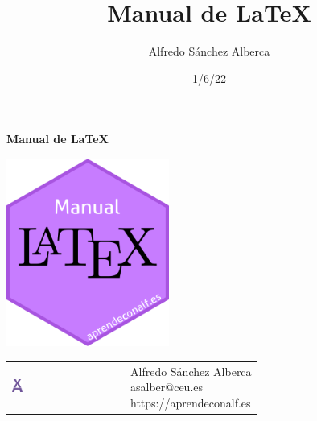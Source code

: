 \documentclass[
  a4paper,
]{scrreport}
\title{Manual de LaTeX}
\author{Alfredo Sánchez Alberca}
\date{1/6/22}
\renewcommand*\contentsname{Tabla de contenidos}
\newcommand\contentsname{Tabla de contenidos}
\begin{document}
\begin{titlepage}

\begin{center}
\vspace*{5cm}

\Huge
{\textbf{\textsf{Manual de LaTeX}}}

\vspace{0.5cm}
\LARGE
{\textbf{\textsf{}}}

\vspace{1.5cm}

\includegraphics[width=0.4\textwidth]{img/logos/sticker.png}
\end{center}

\vfill

\begin{flushleft}
\begin{tabular}{ll}
\includegraphics[width=0.1\textwidth]{img/logos/aprendeconalf.png} & \parbox[b]{5cm}{\Large\textsf{Alfredo
Sánchez
Alberca}\\ \textsf{asalber@ceu.es} \\ \textsf{https://aprendeconalf.es}}
\end{tabular}
\end{flushleft}
\end{titlepage}\ifdefined\Shaded\renewenvironment{Shaded}{\begin{tcolorbox}[borderline west={3pt}{0pt}{shadecolor}, frame hidden, interior hidden, breakable, enhanced, sharp corners, boxrule=0pt]}{\end{tcolorbox}}\fi

\renewcommand*\contentsname{Tabla de contenidos}
{
\hypersetup{linkcolor=}
\setcounter{tocdepth}{2}
\tableofcontents
}
\end{document}

